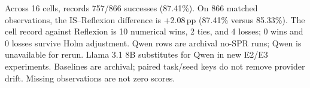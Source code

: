 Across 16 cells, \method records 757/866 successes (87.41\%). On 866 matched observations, the IS--Reflexion difference is +2.08\,pp (87.41\% versus 85.33\%). The cell record against Reflexion is 10 numerical wins, 2 ties, and 4 losses; 0 wins and 0 losses survive Holm adjustment. Qwen rows are archival no-SPR runs; Qwen is unavailable for rerun. Llama 3.1 8B substitutes for Qwen in new E2/E3 experiments. Baselines are archival; paired task/seed keys do not remove provider drift. Missing observations are not zero scores.
